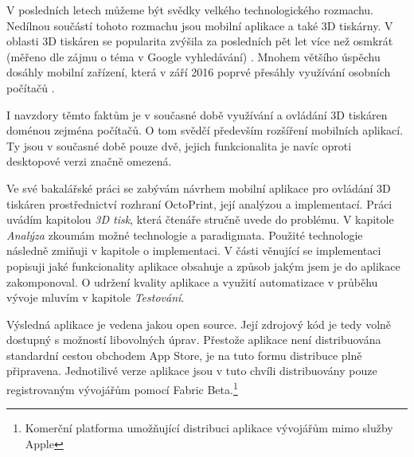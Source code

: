 V posledních letech můžeme být svědky velkého technologického rozmachu.
Nedílnou součástí tohoto rozmachu jsou mobilní aplikace a také 3D tiskárny.
V oblasti 3D tiskáren se popularita zvýšila za posledních pět let více než osmkrát (měřeno dle zájmu o téma v Google vyhledávání) \cite{3d-print-google-trends}.
Mnohem většího úspěchu dosáhly mobilní zařízení, která v září 2016 poprvé přesáhly využívání osobních počítačů \cite{mobile-devices-market-share}.

I navzdory těmto faktům je v současné době využívání a ovládání 3D tiskáren doménou zejména počítačů.
O tom svědčí především rozšíření mobilních aplikací.
Ty jsou v současné době pouze dvě, jejich funkcionalita je navíc oproti desktopové verzi značně omezená.

Ve své bakalářské práci se zabývám návrhem mobilní aplikace pro ovládání 3D tiskáren prostřednictví rozhraní OctoPrint, její analýzou a implementací.
Práci uvádím kapitolou \textit{3D tisk}, která čtenáře stručně uvede do problému.
V kapitole \textit{Analýza} zkoumám možné technologie a paradigmata.
Použité technologie následně zmiňuji v kapitole o implementaci.
V části věnující se implementaci popisuji jaké funkcionality aplikace obsahuje a způsob jakým jsem je do aplikace zakomponoval.
O udržení kvality aplikace a využití automatizace v průběhu vývoje mluvím v kapitole \textit{Testování}.

Výsledná aplikace je vedena jakou open source.
Její zdrojový kód je tedy volně dostupný s možností libovolných úprav.
Přestože aplikace není distribuována standardní cestou obchodem App Store, je na tuto formu distribuce plně připravena.
Jednotilivé verze aplikace jsou v tuto chvíli distribuovány pouze registrovaným vývojářům pomocí Fabric Beta.\footnote{Komerční platforma umožňující distribuci aplikace vývojářům mimo služby Apple}
